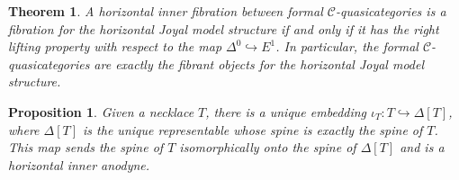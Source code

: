 \documentclass[leqno]{article}
\numberwithin{equation}{subsection}
\theoremstyle{plain}   %
\newtheorem{thm}[equation]{Theorem}
\newtheorem{prop}[equation]{Proposition}
\theoremstyle{remark}
\theoremstyle{plain}
\renewcommand{\C}{\ensuremath{\mathcal{C}}}
\begin{document}
\begin{thm}\label{isofibrations}
	A horizontal inner fibration between formal \(\C\)-quasicategories is a fibration for the horizontal Joyal model structure if and only if it has the right lifting property with respect to the map \(\Delta^0\hookrightarrow E^1\).  In particular, the formal \(\C\)-quasicategories are exactly the fibrant objects for the horizontal Joyal model structure.
\end{thm}

\begin{prop}
	Given a necklace \(T\), there is a unique embedding \(\iota_T:T\hookrightarrow \Delta[T]\), where \(\Delta[T]\) is the unique representable whose spine is exactly the spine of \(T\).  This map sends the spine of \(T\) isomorphically onto the spine of \(\Delta[T]\) and is a horizontal inner anodyne.
\end{prop}
\end{document}
